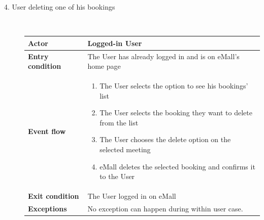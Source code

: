 \documentclass[11pt]{article}
\begin{document}
\begin{description}
    \item [4. User deleting one of his bookings] \hfill \\
    \begin{table}[H]
        \centering
        \setlength{\tabcolsep}{18pt}
        \renewcommand{\arraystretch}{1.4}
        \begin{tabularx}{\textwidth}{|>{\hsize=0.5\hsize}X|>{\hsize=1.5\hsize}X|}
            \hline
            \textbf{Actor} & Logged-in User \\
            \hline
            \textbf{Entry condition} & The User has already logged in and is on eMall's home page \\
            \hline
            \textbf{Event flow} & 
                \begin{minipage}[t]{\hsize}
                \begin{enumerate}[topsep=0pt, leftmargin=*]
                    \item The User selects the option to see his bookings' list
                    \item The User selects the booking they want to delete from the list
                    \item The User chooses the delete option on the selected meeting
                    \item eMall deletes the selected booking and confirms it to the User
                \end{enumerate}
                \end{minipage}
                \vspace{6pt}
            \\
            \hline
            \textbf{Exit condition} & The User logged in on eMall \\
            \hline
            \textbf{Exceptions} & No exception can happen during within user case. \\
            \hline
        \end{tabularx}
    \end{table}
    
    \newpage
    

\end{description}
\end{document}
